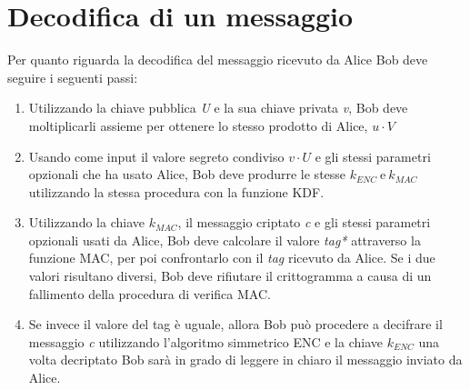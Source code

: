 \documentclass[12pt, a4paper]{report}
\begin{document}
\section{Decodifica di un messaggio}
Per quanto riguarda la decodifica del messaggio ricevuto da Alice Bob deve seguire i seguenti passi:
\begin{enumerate}
    \item Utilizzando la chiave pubblica \textit{U} e la sua chiave privata \textit{v}, Bob deve moltiplicarli assieme per ottenere lo stesso prodotto di Alice, $u\cdot V$
    \item Usando come input il valore segreto condiviso $v\cdot U$ e gli stessi parametri opzionali che ha usato Alice, Bob deve produrre le stesse $k_{ENC} \ \text{e} \ k_{MAC}$ utilizzando la stessa procedura con la funzione KDF.
    \item Utilizzando la chiave $k_{MAC}$, il messaggio criptato \textit{c} e gli stessi parametri opzionali usati da Alice, Bob deve calcolare il valore \textit{tag*} attraverso la funzione MAC, per poi confrontarlo con il \textit{tag} ricevuto da Alice. Se i due valori risultano diversi, Bob deve rifiutare il crittogramma a causa di un fallimento della procedura di verifica MAC.
    \item Se invece il valore del tag è uguale, allora Bob può procedere a decifrare il messaggio \textit{c} utilizzando l'algoritmo simmetrico ENC e la chiave $k_{ENC}$ una volta decriptato Bob sarà in grado di leggere in chiaro il messaggio inviato da Alice.
\end{enumerate}
\end{document}
